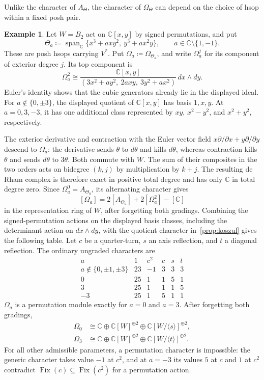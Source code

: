 \documentclass[10pt,a4paper]{amsart}
\newcommand{\defeq}{\coloneqq}
\theoremstyle{definition}
\newtheorem{example}[theorem]{Example}
\newcommand{\C}{\mathbb C}\newcommand{\Q}{\mathbb Q}
\DeclareMathOperator{\Fix}{Fix}
\begin{document}
Unlike the character of $A_\Theta$, the character of $\Omega_\Theta$
can depend on the choice of hsop within a fixed posh pair.

\begin{example}\label{ex:b2-differential-parking}
Let $W=B_2$ act on $\C[x,y]$ by signed permutations, and put
\[
 \Theta_a\defeq\operatorname{span}_{\C}
 \{x^3+axy^2,\ y^3+ax^2y\},
 \qquad a\in\C\setminus\{1,-1\}.
\]
These are posh hsops carrying $V^*$. Put $\Omega_a\defeq\Omega_{\Theta_a}$,
and write $\Omega_a^j$ for its component of exterior degree $j$.
Its top component is
\[
 \Omega_a^2\cong
 \frac{\C[x,y]}{(3x^2+ay^2,\ 2axy,\ 3y^2+ax^2)}\,dx\wedge dy.
\]
Euler's identity shows that the cubic generators already lie in the
displayed ideal. For $a\notin\{0,\pm3\}$, the displayed quotient of $\C[x,y]$ has basis
$1,x,y$. At $a=0,3,-3$, it has one additional class represented by
$xy$, $x^2-y^2$, and $x^2+y^2$, respectively.

The exterior derivative and contraction with the Euler vector field
$x\partial/\partial x+y\partial/\partial y$ descend to $\Omega_a$:
the derivative sends $\theta$ to $d\theta$ and kills $d\theta$,
whereas contraction kills $\theta$ and sends $d\theta$ to $3\theta$.
Both commute with $W$. The sum of their composites in the two orders
acts on bidegree $(k,j)$ by multiplication by $k+j$. The resulting
de Rham complex is therefore
exact in positive total degree and has only $\C$ in total degree zero.
Since $\Omega_a^0=A_{\Theta_a}$, its alternating character gives
\[
 [\Omega_a]=2[A_{\Theta_a}]+2[\Omega_a^2]-[\C]
\]
in the representation ring of $W$, after forgetting both gradings.
Combining the signed-permutation actions on the displayed basis
classes, including the determinant action on $dx\wedge dy$, with
the quotient character in~\cref{prop:koszul} gives the following table.
Let $c$ be a quarter-turn, $s$ an axis reflection, and $t$ a diagonal
reflection. The ordinary ungraded characters are
\[
 \begin{array}{c|rrrrr}
 a & 1 & c^2 & c & s & t\\\hline
 a\notin\{0,\pm1,\pm3\} & 23 & -1 & 3 & 3 & 3\\
 0 & 25 & 1 & 1 & 5 & 1\\
 3 & 25 & 1 & 1 & 1 & 5\\
 -3 & 25 & 1 & 5 & 1 & 1
 \end{array}
\]
$\Omega_a$ is a permutation module exactly for $a=0$ and $a=3$.  After forgetting both gradings,
\[
 \begin{aligned}
 \Omega_0&\cong\C\oplus\C[W]^{\oplus2}
       \oplus\C[W/\langle s\rangle]^{\oplus2},\\
 \Omega_3&\cong\C\oplus\C[W]^{\oplus2}
       \oplus\C[W/\langle t\rangle]^{\oplus2}.
 \end{aligned}
\]
For all other admissible parameters, a permutation character is
impossible: the generic character takes value $-1$ at $c^2$, and
at $a=-3$ its values $5$ at $c$ and $1$ at $c^2$ contradict
$\Fix(c)\subseteq\Fix(c^2)$ for a permutation action.
\end{example}
\end{document}
